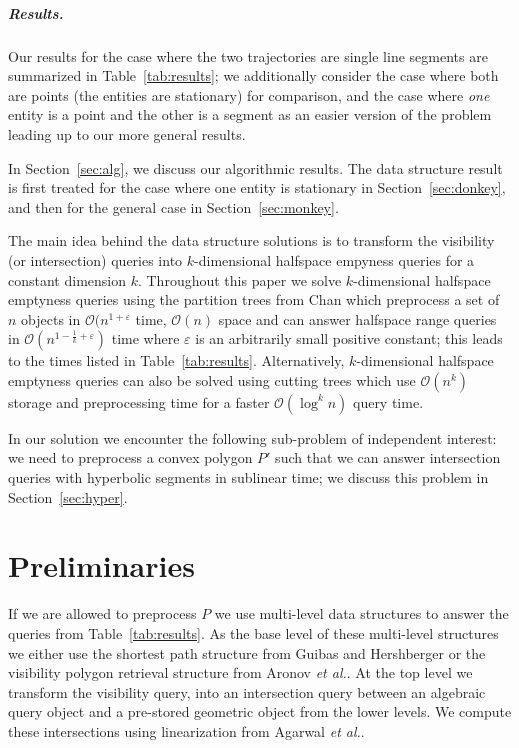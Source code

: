 \documentclass[a4paper, UKenglish]{lipics-v2018}
\newcommand{\etal}{\textit{et al.}\xspace}
\begin{document}
\subparagraph {Results.}
  Our results for the case where the two trajectories are single line segments are summarized in Table~\ref {tab:results}; we additionally consider the case where both are points (the entities are stationary) for comparison, and the case where {\em one} entity is a point and the other is a segment as an easier version of the problem leading up to our more general results.
  
  In Section~\ref {sec:alg}, we discuss our algorithmic results.
  The data structure result is first treated for the case where one entity is stationary in Section~\ref {sec:donkey}, and then for the general case in Section~\ref {sec:monkey}.
  
  The main idea behind the data structure solutions is to transform the visibility (or intersection) queries into $k$-dimensional halfspace empyness queries for a constant dimension $k$. Throughout this paper we solve $k$-dimensional halfspace emptyness queries using the partition trees from Chan \cite{chan2012optimal} which preprocess a set of $n$ objects in $\mathcal{O}(n^{1+ \varepsilon}$ time, $\mathcal{O}(n)$ space and can answer halfspace range queries in $\mathcal{O}(n^{1 - \frac{1}{k} + \varepsilon})$ time where $\varepsilon$ is an arbitrarily small positive constant; this leads to the times listed in Table~\ref {tab:results}. Alternatively, $k$-dimensional halfspace emptyness queries can also be solved using cutting trees which use $\mathcal{O}(n^{k})$ storage and preprocessing time for a faster $\mathcal{O}(\log^k n)$ query time.

In our solution we encounter the following sub-problem of independent interest: we need to preprocess a convex polygon $P'$ such that we can answer intersection queries with hyperbolic segments in sublinear time; we discuss this problem in Section~\ref {sec:hyper}.

\section{Preliminaries}
\label{sec:prelims}

If we are allowed to preprocess $P$ we use multi-level data structures to answer the queries from Table~\ref{tab:results}. As the base level of these multi-level structures we either use the shortest path structure from Guibas and Hershberger \cite{guibas1989optimal} or the visibility polygon retrieval structure from Aronov \etal \cite{aronov2002visibility}. At the top level we transform the visibility query, into an intersection query between an algebraic query object and a pre-stored geometric object from the lower levels. We compute these intersections using linearization from Agarwal \etal \cite{agarwal2013range}.
\end{document}
